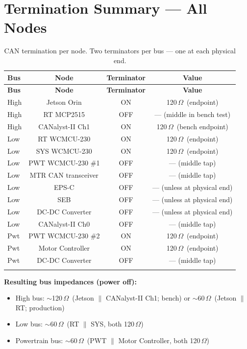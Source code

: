 \documentclass[12pt,a4paper,oneside]{report}
\begin{document}
\section{Termination Summary --- All Nodes}

\begin{center}
\begin{longtable}{lccc}
\toprule
\textbf{Bus} & \textbf{Node} & \textbf{Terminator} & \textbf{Value} \\
\midrule
\endfirsthead
\toprule
\textbf{Bus} & \textbf{Node} & \textbf{Terminator} & \textbf{Value} \\
\midrule
\endhead
High & Jetson Orin        & ON  & 120\,$\Omega$\ (endpoint) \\
High & RT MCP2515         & OFF & --- (middle in bench test) \\
High & CANalyst-II Ch1    & ON  & 120\,$\Omega$\ (bench endpoint) \\
\midrule
Low  & RT WCMCU-230       & ON  & 120\,$\Omega$\ (endpoint) \\
Low  & SYS WCMCU-230      & ON  & 120\,$\Omega$\ (endpoint) \\
Low  & PWT WCMCU-230 \#1  & OFF & --- (middle tap) \\
Low  & MTR CAN transceiver& OFF & --- (middle tap) \\
Low  & EPS-C              & OFF & --- (unless at physical end) \\
Low  & SEB                & OFF & --- (unless at physical end) \\
Low  & DC-DC Converter    & OFF & --- (unless at physical end) \\
Low  & CANalyst-II Ch0    & OFF & --- (middle tap) \\
\midrule
Pwt  & PWT WCMCU-230 \#2  & ON  & 120\,$\Omega$\ (endpoint) \\
Pwt  & Motor Controller   & ON  & 120\,$\Omega$\ (endpoint) \\
Pwt  & DC-DC Converter    & OFF & --- (middle tap) \\
\bottomrule
\caption{CAN termination per node. Two terminators per bus --- one at each physical end.}
\end{longtable}
\end{center}

\noindent\textbf{Resulting bus impedances (power off):}
\begin{itemize}[leftmargin=*,nosep]
  \item High bus: $\sim$120\,$\Omega$\ (Jetson $\parallel$ CANalyst-II Ch1; bench) or $\sim$60\,$\Omega$\ (Jetson $\parallel$ RT; production)
  \item Low bus: $\sim$60\,$\Omega$\ (RT $\parallel$ SYS, both 120\,$\Omega$)
  \item Powertrain bus: $\sim$60\,$\Omega$\ (PWT $\parallel$ Motor Controller, both 120\,$\Omega$)
\end{itemize}
\end{document}
